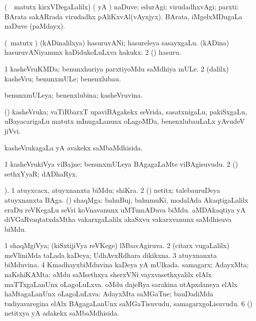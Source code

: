 {{{{\bentry
{} 
\gl{\upa}
\expl{}
\bmng
 (\kanmu\ \nAyxshA\ matutx kirxVDegaLalilx) (\saMkiSx {} yA ) naDuve; edurAgi; virudadhxvAgi; parxti:  BArata sakARrada virudadhx pAliKxvAl(vAyxjyx).  BArata, iMgelxMDugaLa naDuve (paMdayx). 
\emng
\eentry

\bentry
{} 
\gl{\nA}
\expl{}
\bmng
\bnum
{} (\nAyxshA\ matutx \ca) 
\banum
{} (kADinalilxya) hasuruvANi; hasureleya sasayxgaLu. 
 (kADina) hasuruvANiyanunx kaDidukoLuLxva hakukx. 
\eanum
\numie
\num{2} (\vaMlAM) hasuru. 
\enum
\emng
\eentry

\bentry
{} 
\gl{\nA}
\bmng
\bnum
\num{1} kasheVruKMDa; benunxhuriya parxtiyoMdu saMdhiya mULe. 
\num{2} (\bava dalilx) kasheVru; benunxmULe; benenxlubau. 
\enum
\emng
\eentry

\bentry
{} 
\gl{\gu}
\expl{}
\bmng
 benunxmULeya; benenxlubina; kasheVruvina. 
\emng
\eentry

\bentry
{} 
\gl{\nA}
\expl{}
\bmng
 (\pArxvi) kasheVruka; vaTiRbarxT upaviBAgakekx seVrida, sasatxnigaLu, pakiSxgaLu, uBayacarigaLu matutx mInugaLanunx oLagoMDa, benenxlubauLaLx yAvudeV jiVvi. 
\emng
\eentry

\bentry
{} 
\gl{\gu}
\expl{}
\bmng
 kasheVrukagaLa yA avakekx saMbaMdhisida. 
\emng
\eentry

\bentry 
{} 
\gl{\nA}
\expl{}
\bmng
\bnum
\num{1} kasheVrukiVya viBajne; benunxmULeya BAgagaLaMte viBAgisuvudu. 
\num{2} (\rUpa) sethxYyaR; dADhaRyx. 
\enum
\emng
\eentry

\bentry
{} 
\gl{\nA}
). \bmng
\bnum
\num{1} atuyxcacx, atuyxnanxta biMdu; shiKra. 
\num{2} (\aMrashA) netitx; talebauruDeya atuyxnanxta BAga. 
 (\jAyx) shaqMga: 
\banum
{} bahuBuj, bahumuKi, modalAda AkaqtigaLalilx eraDu reVKegaLu seVri koVnavanunx uMTumADuva biMdu. 
 aMDAkaqtiya yA diVGaRvaqtatxdaMtha vakarxgaLalilx akaSxvu vakarxvanunx saMdhisuva biMdu. 
\eanum
\numie
\enum
\emng
\eentry

\bentry
{} 
\gl{\gu}
\expl{}
\bmng
\bnum
\num{1} shaqMgiVya; (kiSxtijiVya reVKege) lMbavAgiruva. 
\num{2} (citarx \mo vugaLalilx) meVliniMda taLada kaDeya; UdhAvxRdhara dikikxna. 
\num{3} atuyxnanxta biMduvina. 
\num{4} KmadhayxbiMduvina kaDeya yA mUlkada. 
 samagarx; AdayxMta; naKshiKAMta: 
\banum
{} oMdu saMsethxya sherxVNi vayxvasethxyalilx elAlx maTTxgaLanUnx oLagoLuLxva. 
 oMdu dajeRya sarakina utApxdaneya elAlx haMtagaLanUnx oLagoLuLxva:  AdayxMta saMGaTne; bauDadiMda tudiyavaregina elAlx BAgagaLanUnx saMGaTisuvudu, samagarxgoLisuvudu. 
\eanum
\numie
\num{6} (\aMrashA) netitxya yA adakekx saMbaMdhisida. 
\enum
\emng
\eentry

}}}}
